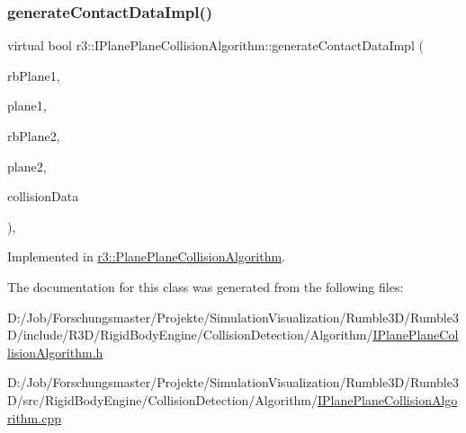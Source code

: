 \mbox{\label{classr3_1_1_i_plane_plane_collision_algorithm_a708dec70f58b4476976dfea9921d1524}} 
\subsubsection{\texorpdfstring{generate\+Contact\+Data\+Impl()}{generateContactDataImpl()}}
{\footnotesize\ttfamily virtual bool r3\+::\+I\+Plane\+Plane\+Collision\+Algorithm\+::generate\+Contact\+Data\+Impl (\begin{DoxyParamCaption}\item[{\mbox{\hyperlink{classr3_1_1_rigid_body}{Rigid\+Body}} $\ast$}]{rb\+Plane1,  }\item[{\mbox{\hyperlink{classr3_1_1_collision_plane}{Collision\+Plane}} $\ast$}]{plane1,  }\item[{\mbox{\hyperlink{classr3_1_1_rigid_body}{Rigid\+Body}} $\ast$}]{rb\+Plane2,  }\item[{\mbox{\hyperlink{classr3_1_1_collision_plane}{Collision\+Plane}} $\ast$}]{plane2,  }\item[{\mbox{\hyperlink{classr3_1_1_collision_data}{Collision\+Data}} \&}]{collision\+Data }\end{DoxyParamCaption})\hspace{0.3cm}{\ttfamily [protected]}, {}}



Implemented in \mbox{\hyperlink{classr3_1_1_plane_plane_collision_algorithm_a33400ba57a8c0550ada0778bb92eeb69}{r3\+::\+Plane\+Plane\+Collision\+Algorithm}}.



The documentation for this class was generated from the following files\+:\begin{DoxyCompactItemize}
\item 
D\+:/\+Job/\+Forschungsmaster/\+Projekte/\+Simulation\+Visualization/\+Rumble3\+D/\+Rumble3\+D/include/\+R3\+D/\+Rigid\+Body\+Engine/\+Collision\+Detection/\+Algorithm/\mbox{\hyperlink{_i_plane_plane_collision_algorithm_8h}{I\+Plane\+Plane\+Collision\+Algorithm.\+h}}\item 
D\+:/\+Job/\+Forschungsmaster/\+Projekte/\+Simulation\+Visualization/\+Rumble3\+D/\+Rumble3\+D/src/\+Rigid\+Body\+Engine/\+Collision\+Detection/\+Algorithm/\mbox{\hyperlink{_i_plane_plane_collision_algorithm_8cpp}{I\+Plane\+Plane\+Collision\+Algorithm.\+cpp}}\end{DoxyCompactItemize}
